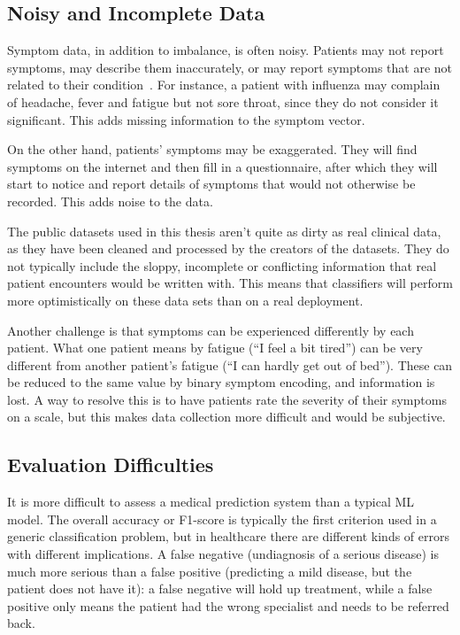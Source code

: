 \subsection{Noisy and Incomplete Data}

Symptom data, in addition to imbalance, is often noisy. Patients may not report symptoms, may describe them inaccurately, or may report symptoms that are not related to their condition~\citep{Chowdhury2024}. For instance, a patient with influenza may complain of headache, fever and fatigue but not sore throat, since they do not consider it significant. This adds missing information to the symptom vector.

On the other hand, patients' symptoms may be exaggerated. They will find symptoms on the internet and then fill in a questionnaire, after which they will start to notice and report details of symptoms that would not otherwise be recorded. This adds noise to the data.

The public datasets used in this thesis aren't quite as dirty as real clinical data, as they have been cleaned and processed by the creators of the datasets. They do not typically include the sloppy, incomplete or conflicting information that real patient encounters would be written with. This means that classifiers will perform more optimistically on these data sets than on a real deployment.

Another challenge is that symptoms can be experienced differently by each patient. What one patient means by fatigue (``I feel a bit tired'') can be very different from another patient's fatigue (``I can hardly get out of bed''). These can be reduced to the same value by binary symptom encoding, and information is lost. A way to resolve this is to have patients rate the severity of their symptoms on a scale, but this makes data collection more difficult and would be subjective.

\subsection{Evaluation Difficulties}

It is more difficult to assess a medical prediction system than a typical ML model. The overall accuracy or F1-score is typically the first criterion used in a generic classification problem, but in healthcare there are different kinds of errors with different implications. A false negative (undiagnosis of a serious disease) is much more serious than a false positive (predicting a mild disease, but the patient does not have it): a false negative will hold up treatment, while a false positive only means the patient had the wrong specialist and needs to be referred back.

